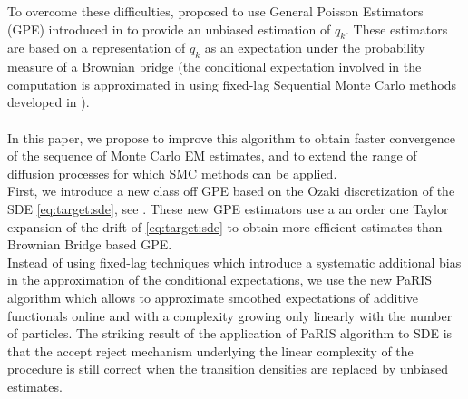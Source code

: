 \documentclass[12pt]{article}
\newcommand{\1}{\mathrm{1}}
\newcommand{\qk}{q_{k}}
\begin{document}
To overcome these difficulties, \cite{olsson:strojby:2011} proposed to use General Poisson Estimators (GPE) introduced in \cite{beskos:papaspiliopoulos:roberts:fearnhead:2006,fearnhead:papaspiliopoulos:roberts:2008}  to provide an unbiased estimation of $\qk$. 
These estimators are based on a representation of $\qk$ as an expectation under the probability measure of a Brownian bridge (the conditional expectation involved in the computation is approximated in  \cite{olsson:strojby:2011}  using fixed-lag Sequential Monte Carlo methods developed in \cite{olsson:cappe:douc:moulines:2008}).\\ 
\\
In this paper, we propose to improve this algorithm to obtain faster convergence of the sequence of Monte Carlo EM estimates, and to extend the range of diffusion processes for which SMC methods can be applied.\\ 
First, we introduce a new class off GPE based on the Ozaki discretization of the SDE  \eqref{eq:target:sde}, see \cite{ozaki:1992,shoji:ozaki:1998}. 
These new GPE estimators use a an order one Taylor expansion of the drift of \eqref{eq:target:sde} to obtain more efficient estimates than Brownian Bridge based GPE.\\ 
Instead of using fixed-lag techniques which introduce a systematic additional bias  in the approximation of the conditional expectations, we use the new PaRIS algorithm which allows to approximate smoothed expectations of additive functionals online and with a complexity growing only linearly with the number of particles. 
The striking result of the application of PaRIS algorithm to SDE is that the accept reject mechanism underlying the linear complexity of the procedure is still correct when the transition densities are replaced by unbiased estimates.
\end{document}
